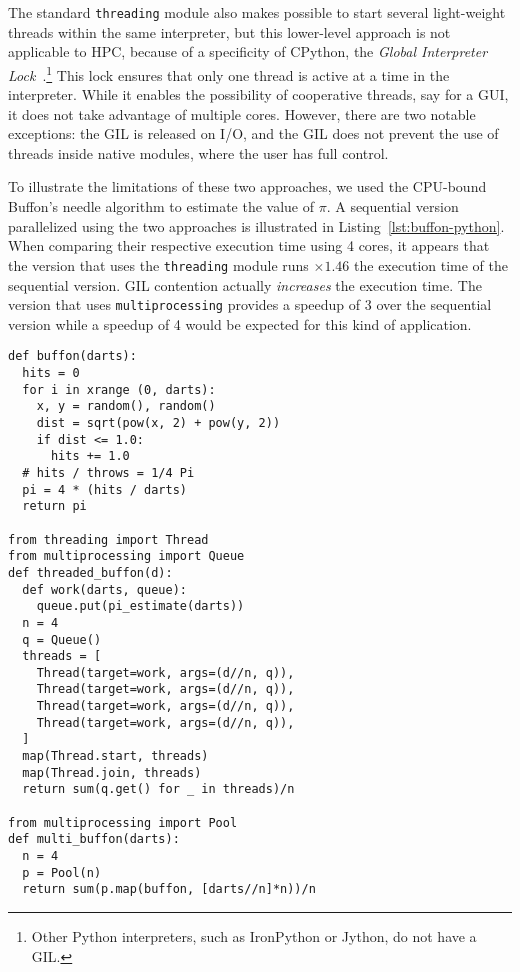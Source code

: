\documentclass[conference]{IEEEtran}
\begin{document}
The standard \texttt{threading} module also makes possible to start several
light-weight threads within the same interpreter, but this lower-level approach
is not applicable to HPC, because of a specificity of CPython, the \emph{Global
Interpreter Lock}~\cite{gil2012}.\footnote{Other Python interpreters, such as
IronPython or Jython, do not have a GIL.} This lock ensures that only one thread
is active at a time in the interpreter. While it enables the possibility of
cooperative threads, say for a GUI, it does not take advantage of multiple
cores. However, there are two notable exceptions: the GIL is released on I/O,
and the GIL does not prevent the use of threads inside native modules, where the
user has full control.

To illustrate the limitations of these two approaches, we used the CPU-bound
Buffon's needle algorithm to estimate the value of $\pi$. A sequential version
parallelized using the two approaches is illustrated in
Listing~\ref{lst:buffon-python}. When comparing their respective execution time
using 4 cores, it appears that the version that uses the \texttt{threading}
module runs $\times 1.46$ the execution time of the sequential version. GIL
contention actually \emph{increases} the execution time. The version that uses
\texttt{multiprocessing} provides a speedup of 3 over the sequential version
while a speedup of 4 would be expected for this kind of application.

\begin{lstlisting}[float, label={lst:buffon-python}, caption={Implementation of
sequential and parallel version of the Buffon algorithm in Python.}]
def buffon(darts):
  hits = 0
  for i in xrange (0, darts):
    x, y = random(), random()
    dist = sqrt(pow(x, 2) + pow(y, 2))
    if dist <= 1.0:
      hits += 1.0
  # hits / throws = 1/4 Pi
  pi = 4 * (hits / darts)
  return pi

from threading import Thread
from multiprocessing import Queue
def threaded_buffon(d):
  def work(darts, queue):
    queue.put(pi_estimate(darts))
  n = 4
  q = Queue()
  threads = [
    Thread(target=work, args=(d//n, q)),
    Thread(target=work, args=(d//n, q)),
    Thread(target=work, args=(d//n, q)),
    Thread(target=work, args=(d//n, q)),
  ]
  map(Thread.start, threads)
  map(Thread.join, threads)
  return sum(q.get() for _ in threads)/n

from multiprocessing import Pool
def multi_buffon(darts):
  n = 4
  p = Pool(n)
  return sum(p.map(buffon, [darts//n]*n))/n
\end{lstlisting}
\end{document}
